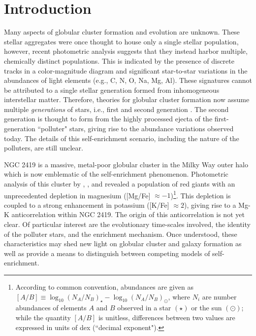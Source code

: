 \documentclass[twocolumn]{aastex6}
\begin{document}
\section{Introduction} \label{sec:intro}
Many aspects of globular cluster formation and evolution are unknown. These stellar aggregates were once thought to house only a single stellar population, however, recent photometric analysis suggests that they instead harbor multiple, chemically distinct populations. This is indicated by the presence of discrete tracks in a color-magnitude diagram \citep{Villanova_2007,Piotto_2007} and significant star-to-star variations in the abundances of light elements (e.g., C, N, O, Na, Mg, Al). 
These signatures cannot be attributed to a single stellar generation formed from inhomogeneous interstellar matter.
Therefore, theories for globular cluster formation now assume multiple \textit{generations} of stars, i.e., first and second generation \citep{D_Ercole_2008,Carretta_2010}.
The second generation is thought to form from the highly processed ejecta of the first-generation ``polluter" stars, giving rise to the abundance variations observed today. 
The details of this self-enrichment scenario, including the nature of the polluters, are still unclear.
\par
NGC 2419 is a massive, metal-poor globular cluster in the Milky Way outer halo which is now emblematic of the self-enrichment phenomenon. 
Photometric analysis of this cluster by \citet{Cohen_2011}, \citet{Cohen_2012}, and \citet{Mucciarelli_2012} revealed a population of red giants with an unprecedented depletion in magnesium ([Mg/Fe] $\approx -1$)\footnote{According to common convention, abundances are given as $[A/B]\equiv \log_{10}(N_A/N_B)_\star - \log_{10}(N_A/N_B)_\odot$, where $N_i$ are number abundances of elements $A$ and $B$ observed in a star $(\star)$ or the sun $(\odot)$; while the quantity $[A/B]$ is unitless, differences between two values are expressed in units of dex (``decimal exponent").}. 
This depletion is coupled to a strong enhancement in potassium ([K/Fe] $\approx 2$), giving rise to a Mg-K anticorrelation within NGC 2419. 
The origin of this anticorrelation is not yet clear.   
Of particular interest are the evolutionary time-scales involved, the identity of the polluter stars, and the enrichment mechanism.
Once understood, these characteristics may shed new light on globular cluster and galaxy formation as well as provide a means to distinguish between competing models of self-enrichment.
\par
\end{document}
